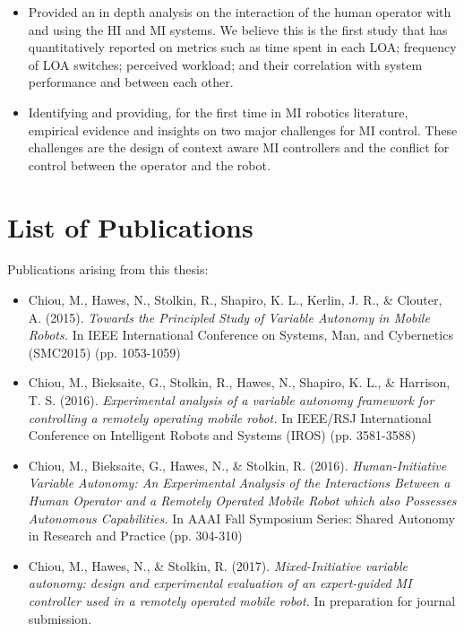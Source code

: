 \documentclass[a4paper,12pt,oneside,openright]{bhamthesis}
\begin{document}
\begin{itemize}
    \item Provided an in depth analysis on the interaction of the human operator with and using the HI and MI systems. We believe this is the first study that has quantitatively reported on metrics such as time spent in each LOA; frequency of LOA switches; perceived workload; and their correlation with system performance and between each other.
    
   \item Identifying and providing, for the first time in MI robotics literature, empirical evidence and insights on two major challenges for MI control. These challenges are the design of context aware MI controllers and the conflict for control between the operator and the robot. 
	
\end{itemize}

\section{List of Publications}
Publications arising from this thesis:

\begin{itemize}
 
\item Chiou, M., Hawes, N., Stolkin, R., Shapiro, K. L., Kerlin, J. R., \& Clouter, A. (2015). \emph{Towards the Principled Study of Variable Autonomy in Mobile Robots.} In IEEE International Conference on Systems, Man, and Cybernetics (SMC2015) (pp. 1053-1059)

\item Chiou, M., Bieksaite, G., Stolkin, R., Hawes, N., Shapiro, K. L., \& Harrison, T. S. (2016). \emph{Experimental analysis of a variable autonomy framework for controlling a remotely operating mobile robot.} In IEEE/RSJ International Conference on Intelligent Robots and Systems (IROS) (pp. 3581-3588)

\item Chiou, M., Bieksaite, G., Hawes, N., \& Stolkin, R. (2016). \emph{Human-Initiative Variable Autonomy: An Experimental Analysis of the Interactions Between a Human Operator and a Remotely Operated Mobile Robot which also Possesses Autonomous Capabilities.} In AAAI Fall Symposium Series: Shared Autonomy in Research and Practice (pp. 304-310)

\item Chiou, M., Hawes, N., \& Stolkin, R. (2017). \emph{Mixed-Initiative variable autonomy: design and experimental evaluation of an expert-guided MI controller used in a remotely operated mobile robot.} In preparation for journal submission.
 
\end{itemize}
\end{document}
